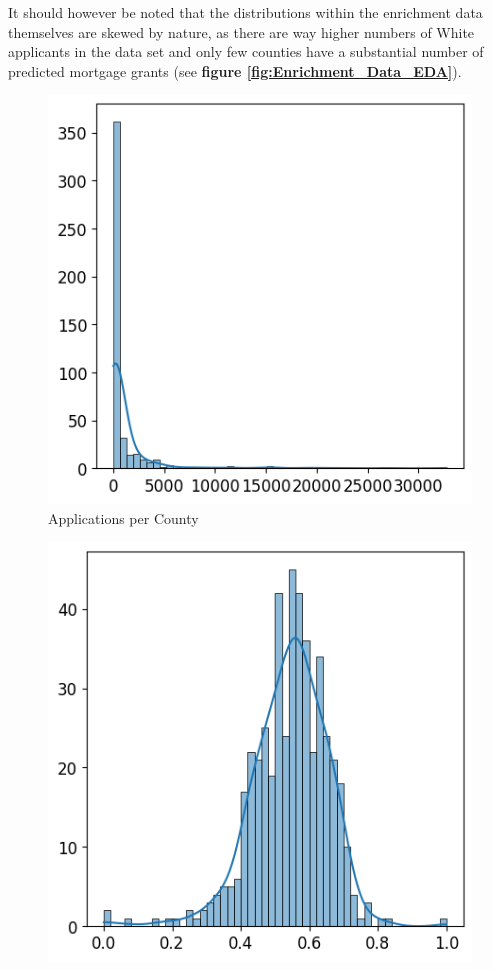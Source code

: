 It should however be noted that the distributions within the enrichment data themselves are skewed by nature, as there are way higher numbers of White applicants in the data set and only few counties have a substantial number of predicted mortgage grants (see \textbf{figure \ref{fig:Enrichment_Data_EDA}}).

\begin{figure}[h]
    \centering
    \begin{minipage}{0.33\textwidth}
        \centering
        \includegraphics[width=\textwidth]{images/geo_enrich/predictions_per_county.png}
        \small
        Applications per County
    \end{minipage}\hfill
    \begin{minipage}{0.33\textwidth}
        \centering
        \includegraphics[width=\textwidth]{images/geo_enrich/perc_predictions.png}

\end{minipage}
\end{figure}
